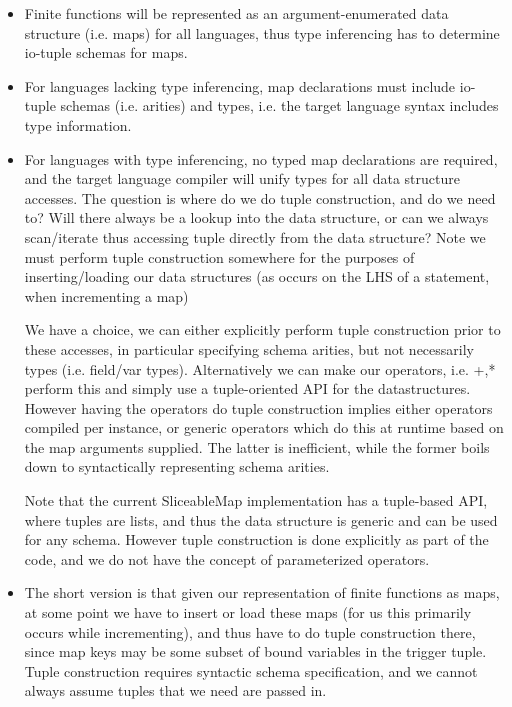 \begin{itemize}
  \item Finite functions will be represented as an argument-enumerated data
  structure (i.e. maps) for all languages, thus type inferencing has to
  determine io-tuple schemas for maps.
  \item For languages lacking type inferencing, map declarations must include
  io-tuple schemas (i.e. arities) and types, i.e. the target language syntax
  includes type information.
  \item For languages with type inferencing, no typed map declarations are
  required, and the target language compiler will unify types for all data
  structure accesses.
  The question is where do we do tuple construction, and do we need to? 
  Will there always be a lookup into the data structure, or can we always
  scan/iterate thus accessing tuple directly from the data structure?
  Note we must perform tuple construction somewhere for the purposes of
  inserting/loading our data structures (as occurs on the LHS of a statement,
  when incrementing a map)
  
  We have a choice, we can either explicitly perform tuple construction
  prior to these accesses, in particular specifying schema arities, but not
  necessarily types (i.e. field/var types).
  Alternatively we can make our operators, i.e. +,* perform this and simply use
  a tuple-oriented API for the datastructures. However having the operators do
  tuple construction implies either operators compiled per instance, or generic
  operators which do this at runtime based on the map arguments supplied. The
  latter is inefficient, while the former boils down to syntactically
  representing schema arities.
  
  Note that the current SliceableMap implementation has a tuple-based API,
  where tuples are lists, and thus the data structure is generic and can be
  used for any schema. However tuple construction is done explicitly as part of
  the code, and we do not have the concept of parameterized operators.
  
  \item The short version is that given our representation of finite functions
  as maps, at some point we have to insert or load these maps (for us this
  primarily occurs while incrementing), and thus have to do tuple construction
  there, since map keys may be some subset of bound variables in the trigger
  tuple. Tuple construction requires syntactic schema specification, and we
  cannot always assume tuples that we need are passed in.
\end{itemize}

